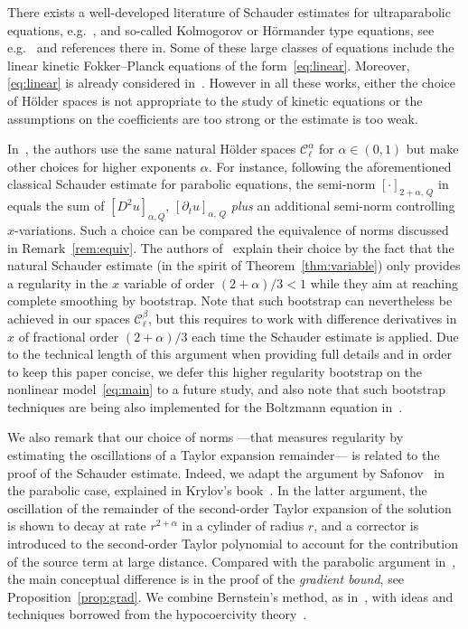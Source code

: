 \documentclass[10pt]{amsart}
\theoremstyle{definition}\newtheorem{defi}[theo]{Definition}\newtheorem{rema}[theo]{Remark}\newtheorem{exam}[theo]{Example}\newtheorem{exem}[theo]{Example}\newtheorem{nota}[theo]{Notation}
\newcommand{\cC}{\mathcal{C}}
\begin{document}
There exists a well-developed literature of Schauder estimates for ultraparabolic equations, e.g.~\cite{manfredini,polidoro1994}, and so-called Kolmogorov or H\"ormander type equations, see e.g.~\cite{bb,dfp,lunardi1997,radkevich2008} and references there in. Some of these large classes of equations include the linear kinetic Fokker--Planck equations of the form~\eqref{eq:linear}. Moreover, \eqref{eq:linear} is already considered in~\cite{hs}. However in all these works, either the choice of H\"older spaces is not appropriate to the study of kinetic equations or the assumptions on the coefficients are too strong or the estimate is too weak.

In~\cite{hs}, the authors use the same natural H\"older spaces $\cC_\ell^\alpha$ for $\alpha \in (0,1)$ but make other choices for higher exponents $\alpha$. For instance, following the aforementioned classical Schauder estimate for parabolic equations, the semi-norm $[\cdot]_{2+\alpha,\,Q}$ in~\cite{hs} equals the sum of $[D^2u]_{\alpha,Q}$, $[\partial_t u]_{\alpha,\,Q}$ \emph{plus} an additional semi-norm controlling $x$-variations. Such a choice can be compared the equivalence of norms discussed in Remark~\ref{rem:equiv}. The authors of~\cite{hs} explain their choice by the fact that the natural Schauder estimate (in the spirit of Theorem~\ref{thm:variable}) only provides a regularity in the $x$ variable of order $(2+\alpha)/3 <1$ while they aim at reaching complete smoothing by bootstrap. Note that such bootstrap can nevertheless be achieved in our spaces $\cC_\ell^\beta$, but this requires to work with difference derivatives in $x$ of fractional order $(2+\alpha)/3$ each time the Schauder estimate is applied. Due to the technical length of this argument when providing full details and in order to keep this paper concise, we defer this higher regularity bootstrap on the nonlinear model~\eqref{eq:main} to a future study, and also note that such bootstrap techniques are being also implemented for the Boltzmann equation in~\cite{bootstrap}.

We also remark that our choice of norms ---that measures regularity by estimating the oscillations of a Taylor expansion remainder--- is related to the proof of the Schauder estimate. Indeed, we adapt the argument by Safonov~\cite{safonov1984} in the parabolic case, explained in Krylov's book~\cite{krylov1996}. In the latter argument, the oscillation of the remainder of the second-order Taylor expansion of the solution is shown to decay at rate $r^{2+\alpha}$ in a cylinder of radius $r$, and a corrector is introduced to the second-order Taylor polynomial to account for the contribution of the source term at large distance. Compared with the parabolic argument in~\cite{krylov1996}, the main conceptual difference is in the proof of the \emph{gradient bound}, see Proposition~\ref{prop:grad}. We combine Bernstein's method, as in~\cite{krylov1996}, with ideas and techniques borrowed from the hypocoercivity theory~\cite{villani2009memoir}.
\end{document}
